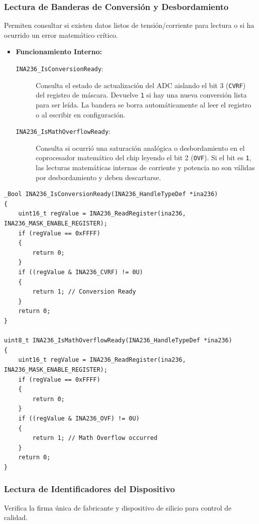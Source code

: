 \documentclass[
10pt, %
a4paper, %
oneside, %
headinclude,footinclude, %
BCOR5mm, %
]{scrartcl}
\begin{document}
\subsubsection{Lectura de Banderas de Conversión y Desbordamiento}
Permiten consultar si existen datos listos de tensión/corriente para lectura o si ha ocurrido un error matemático crítico.

\begin{itemize}
	\item \textbf{Funcionamiento Interno:}
		\begin{description}
			\item[\texttt{INA236\_IsConversionReady}:] Consulta el estado de actualización del ADC aislando el bit 3 (\texttt{CVRF}) del registro de máscara. Devuelve \texttt{1} si hay una nueva conversión lista para ser leída. La bandera se borra automáticamente al leer el registro o al escribir en configuración.
			\item[\texttt{INA236\_IsMathOverflowReady}:] Consulta si ocurrió una saturación analógica o desbordamiento en el coprocesador matemático del chip leyendo el bit 2 (\texttt{OVF}). Si el bit es \texttt{1}, las lecturas matemáticas internas de corriente y potencia no son válidas por desbordamiento y deben descartarse.
		\end{description}
\end{itemize}

\begin{lstlisting}[style=CMakeStyle]
_Bool INA236_IsConversionReady(INA236_HandleTypeDef *ina236)
{
    uint16_t regValue = INA236_ReadRegister(ina236, INA236_MASK_ENABLE_REGISTER);
    if (regValue == 0xFFFF)
    {
        return 0;
    }
    if ((regValue & INA236_CVRF) != 0U)
    {
        return 1; // Conversion Ready
    }
    return 0;
}

uint8_t INA236_IsMathOverflowReady(INA236_HandleTypeDef *ina236)
{
    uint16_t regValue = INA236_ReadRegister(ina236, INA236_MASK_ENABLE_REGISTER);
    if (regValue == 0xFFFF)
    {
        return 0;
    }
    if ((regValue & INA236_OVF) != 0U)
    {
        return 1; // Math Overflow occurred
    }
    return 0;
}
\end{lstlisting}

\subsubsection{Lectura de Identificadores del Dispositivo}
Verifica la firma única de fabricante y dispositivo de silicio para control de calidad.
\end{document}
